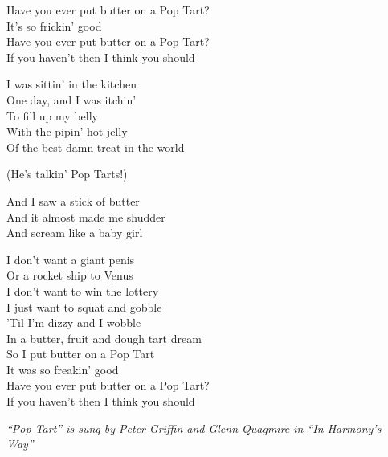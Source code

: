 \vspace{10pt}
Have you ever put butter on a Pop Tart?\\
It's so frickin' good\\
Have you ever put butter on a Pop Tart?\\
If you haven't then I think you should\par
\vspace{10pt}
I was sittin' in the kitchen\\
One day, and I was itchin'\\
To fill up my belly\\
With the pipin' hot jelly\\
Of the best damn treat in the world\par
\vspace{10pt}
(He's talkin' Pop Tarts!)\par
\vspace{10pt}
And I saw a stick of butter\\
And it almost made me shudder\\
And scream like a baby girl\par
\vspace{10pt}
I don't want a giant penis\\
Or a rocket ship to Venus\\
I don't want to win the lottery\\
I just want to squat and gobble\\
'Til I'm dizzy and I wobble\\
In a butter, fruit and dough tart dream\\
So I put butter on a Pop Tart\\
It was so freakin' good\\
Have you ever put butter on a Pop Tart?\\
If you haven't then I think you should\par
\vspace{10pt}
{\footnotesize\textit{``Pop Tart'' is sung by Peter Griffin and Glenn Quagmire in ``In Harmony's Way''}}
